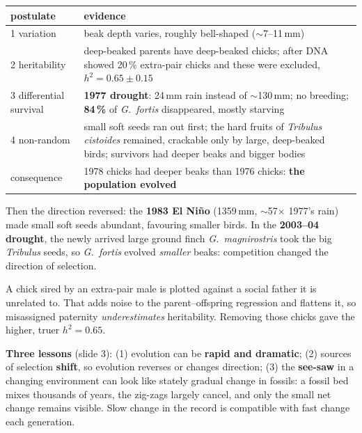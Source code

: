 \begin{center}\small
\begin{tabularx}{\textwidth}{lX}
\toprule
postulate & evidence\\\midrule
1 variation & beak depth varies, roughly bell-shaped ($\sim$7--11\,mm)\\
2 heritability & deep-beaked parents have deep-beaked chicks; after DNA showed 20\,\% extra-pair chicks and these were excluded,
$h^2=0.65\pm0.15$\\
3 differential survival & \textbf{1977 drought}: 24\,mm rain instead of $\sim$130\,mm; no breeding; \textbf{84\,\%} of \emph{G.\ fortis}
disappeared, mostly starving\\
4 non-random & small soft seeds ran out first; the hard fruits of \emph{Tribulus cistoides} remained, crackable only by large,
deep-beaked birds; survivors had deeper beaks and bigger bodies\\
consequence & 1978 chicks had deeper beaks than 1976 chicks: \textbf{the population evolved}\\\bottomrule
\end{tabularx}
\end{center}

Then the direction reversed: the \textbf{1983 El Niño} (1359\,mm, $\sim$57$\times$ 1977's rain) made small soft seeds
abundant, favouring smaller birds. In the \textbf{2003--04 drought}, the newly arrived large ground finch \emph{G.\
magnirostris} took the big \emph{Tribulus} seeds, so \emph{G.\ fortis} evolved \emph{smaller} beaks: competition changed the
direction of selection.

\begin{chain}
A chick sired by an extra-pair male is plotted against a social father it is unrelated to. That adds noise to the
parent--offspring regression and flattens it, so misassigned paternity \emph{underestimates} heritability. Removing those
chicks gave the higher, truer $h^2=0.65$.
\end{chain}

\textbf{Three lessons} (slide 3): (1) evolution can be \textbf{rapid and dramatic}; (2) sources of selection
\textbf{shift}, so evolution reverses or changes direction; (3) the \textbf{see-saw} in a changing environment can look like
stately gradual change in fossils: a fossil bed mixes thousands of years, the zig-zags largely cancel, and only the small
net change remains visible. Slow change in the record is compatible with fast change each generation.

